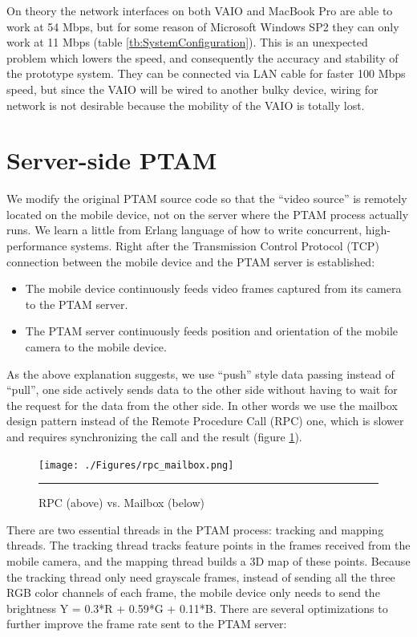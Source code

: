 On theory the network interfaces on both VAIO and MacBook Pro are able to work at 54 Mbps, but for some reason of Microsoft Windows SP2 they can only work at 11 Mbps (table \ref{tb:SystemConfiguration}). This is an unexpected problem which lowers the speed, and consequently the accuracy and stability of the prototype system. They can be connected via LAN cable for faster 100 Mbps speed, but since the VAIO will be wired to another bulky device, wiring for network is not desirable because the mobility of the VAIO is totally lost.


\section{Server-side PTAM}

We modify the original PTAM source code so that the ``video source'' is remotely located on the mobile device, not on the server where the PTAM process actually runs. We learn a little from Erlang language \cite{Reference17} of how to write concurrent, high-performance systems. Right after the Transmission Control Protocol (TCP) connection between the mobile device and the PTAM server is established:

\begin{itemize}
	\item The mobile device continuously feeds video frames captured from its camera to the PTAM server.
	\item The PTAM server continuously feeds position and orientation of the mobile camera to the mobile device.
\end{itemize}

As the above explanation suggests, we use ``push'' style data passing instead of ``pull'', one side actively sends data to the other side without having to wait for the request for the data from the other side. In other words we use the mailbox design pattern instead of the Remote Procedure Call (RPC) one, which is slower and requires synchronizing the call and the result (figure \ref{fig:RPCMailbox}).

\begin{figure}[htbp]
	\centering
	\texttt{[image: ./Figures/rpc\_mailbox.png]}
	\rule{35em}{0.5pt}
	\caption[RPC vs. Mailbox]{RPC (above) vs. Mailbox (below)}
	\label{fig:RPCMailbox}
\end{figure}

There are two essential threads in the PTAM process: tracking and mapping threads. The tracking thread tracks feature points in the frames received from the mobile camera, and the mapping thread builds a 3D map of these points. Because the tracking thread only need grayscale frames, instead of sending all the three RGB color channels of each frame, the mobile device only needs to send the brightness Y = 0.3*R + 0.59*G + 0.11*B. There are several optimizations to further improve the frame rate sent to the PTAM server:

